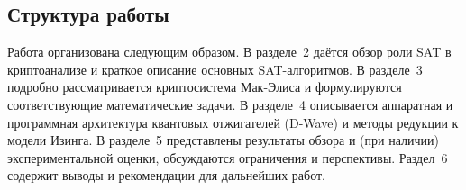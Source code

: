 \subsection*{Структура работы}
Работа организована следующим образом. В разделе~2 даётся обзор роли SAT в криптоанализе и краткое описание основных SAT-алгоритмов. В разделе~3 подробно рассматривается криптосистема Мак-Элиса и формулируются соответствующие математические задачи. В разделе~4 описывается аппаратная и программная архитектура квантовых отжигателей (D-Wave) и методы редукции к модели Изинга. В разделе~5 представлены результаты обзора и (при наличии) экспериментальной оценки, обсуждаются ограничения и перспективы. Раздел~6 содержит выводы и рекомендации для дальнейших работ.

